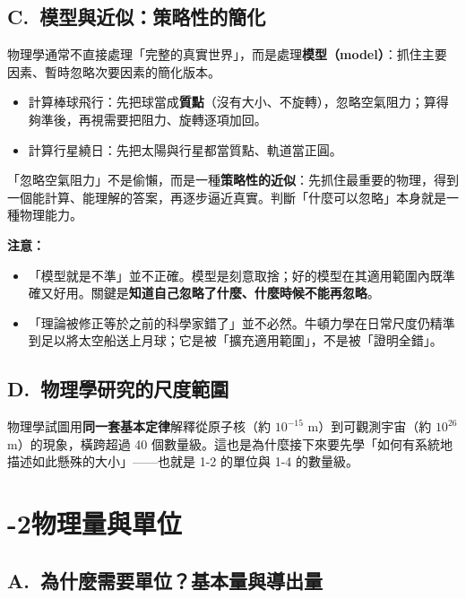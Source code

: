 \documentclass[11pt]{article}
\begin{document}
\subsection*{\sffamily C.\ 模型與近似：策略性的簡化}

物理學通常不直接處理「完整的真實世界」，而是處理\textbf{模型（model）}：抓住主要因素、暫時忽略次要因素的簡化版本。

\begin{itemize}\setlength{\itemsep}{1pt}
\item 計算棒球飛行：先把球當成\textbf{質點}（沒有大小、不旋轉），忽略空氣阻力；算得夠準後，再視需要把阻力、旋轉逐項加回。
\item 計算行星繞日：先把太陽與行星都當質點、軌道當正圓。
\end{itemize}

「忽略空氣阻力」不是偷懶，而是一種\textbf{策略性的近似}：先抓住最重要的物理，得到一個能計算、能理解的答案，再逐步逼近真實。判斷「什麼可以忽略」本身就是一種物理能力。

\textbf{注意：}
\begin{itemize}\setlength{\itemsep}{1pt}
\item 「模型就是不準」並不正確。模型是刻意取捨；好的模型在其適用範圍內既準確又好用。關鍵是\textbf{知道自己忽略了什麼、什麼時候不能再忽略}。
\item 「理論被修正等於之前的科學家錯了」並不必然。牛頓力學在日常尺度仍精準到足以將太空船送上月球；它是被「擴充適用範圍」，不是被「證明全錯」。
\end{itemize}

\subsection*{\sffamily D.\ 物理學研究的尺度範圍}

物理學試圖用\textbf{同一套基本定律}解釋從原子核（約 $10^{-15}$ m）到可觀測宇宙（約 $10^{26}$ m）的現象，橫跨超過 40 個數量級。這也是為什麼接下來要先學「如何有系統地描述如此懸殊的大小」——也就是 1-2 的單位與 1-4 的數量級。

\section*{-2\quad 物理量與單位}

\subsection*{\sffamily A.\ 為什麼需要單位？基本量與導出量}
\end{document}
